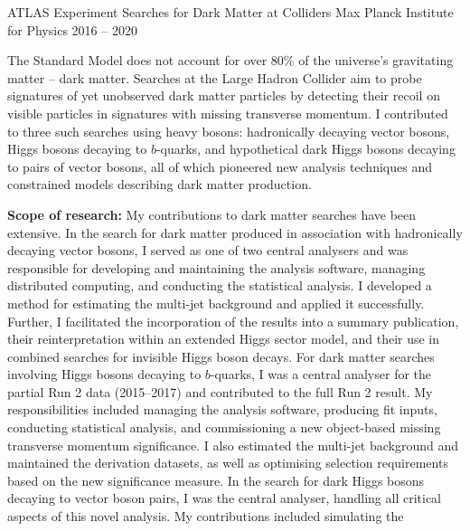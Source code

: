 \begin{cventries}
  \cventry
    {ATLAS Experiment} %
    {Searches for Dark Matter at Colliders} %
    {Max Planck Institute for Physics} %
    {2016 -- 2020} %
    {
      \begin{cvitems} %
        \item {The Standard Model does not account for over 80\% of the universe’s gravitating matter – dark matter. Searches at the Large Hadron Collider aim to probe signatures of yet unobserved dark matter particles by detecting their recoil on visible particles in signatures with missing transverse momentum. I contributed to three such searches using heavy bosons: hadronically decaying vector bosons, Higgs bosons decaying to \(b\)-quarks, and hypothetical dark Higgs bosons decaying to pairs of vector bosons, all of which pioneered new analysis techniques and constrained models describing dark matter production.}
        \item \textbf{Scope of research:} My contributions to dark matter searches have been extensive. In the search
        for dark matter produced in association with hadronically decaying vector bosons, I served as
        one of two central analysers and was responsible for developing and maintaining the analysis
        software, managing distributed computing, and conducting the statistical analysis. I developed
        a method for estimating the multi-jet background and applied it successfully. Further, I
        facilitated the incorporation of the results into a summary publication, their reinterpretation
        within an extended Higgs sector model, and their use in combined searches for invisible Higgs
        boson decays. For dark matter searches involving Higgs bosons decaying to \(b\)-quarks, I was a
        central analyser for the partial Run 2 data (2015--2017) and contributed to the full Run 2 result.
        My responsibilities included managing the analysis software, producing fit inputs, conducting
        statistical analysis, and commissioning a new object-based missing transverse momentum
        significance. I also estimated the multi-jet background and maintained the derivation datasets,
        as well as optimising selection requirements based on the new significance measure. In the
        search for dark Higgs bosons decaying to vector boson pairs, I was the central analyser,
        handling all critical aspects of this novel analysis. My contributions included simulating the

\end{cvitems}}
\end{cventries}
